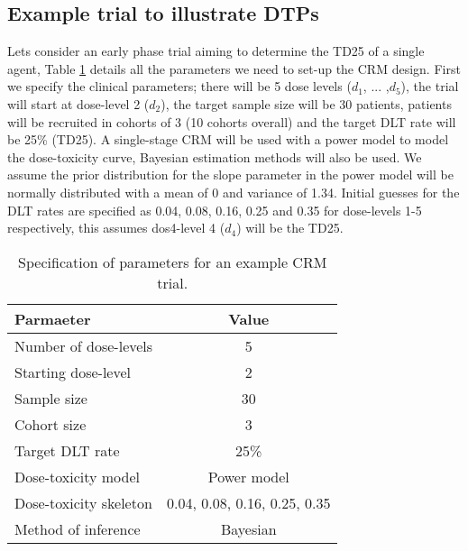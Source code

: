 \subsection{Example trial to illustrate DTPs}
\label{tite-dtp:Example-DTPs}

Lets consider an early phase trial aiming to determine the TD25 of a single agent, Table \ref{tab_tite-dtp:exampleCRMspecs} details all the parameters we need to set-up the CRM design. First we specify the clinical parameters; there will be 5 dose levels ($d_1$, ... ,$d_5$), the trial will start at dose-level 2 ($d_2$), the target sample size will be 30 patients, patients will be recruited in cohorts of 3 (10 cohorts overall) and the target DLT rate will be 25\% (TD25). A single-stage CRM will be used with a power model to model the dose-toxicity curve, Bayesian estimation methods will also be used. We assume the prior distribution for the slope parameter in the power model will be normally distributed with a mean of 0 and variance of 1.34. Initial guesses for the DLT rates are specified as 0.04, 0.08, 0.16, 0.25 and 0.35 for dose-levels 1-5 respectively, this assumes dos4-level 4 ($d_4$) will be the TD25. 

\begin{table}[h!]
	\centering
	\caption{Specification of parameters for an example CRM trial. }
	\label{tab_tite-dtp:exampleCRMspecs}
	\begin{tabular}{l|c}
		\hline
		\textbf{Parmaeter}     & \textbf{Value}               \\ \hline
		Number of dose-levels  & 5                            \\
		Starting dose-level    & 2                            \\
		Sample size            & 30                           \\
		Cohort size            & 3                            \\
		Target DLT rate        & 25\%                         \\
		Dose-toxicity model    & Power model                  \\
		Dose-toxicity skeleton & 0.04, 0.08, 0.16, 0.25, 0.35 \\
		Method of inference    & Bayesian                     \\ \hline
	\end{tabular}
\end{table}

